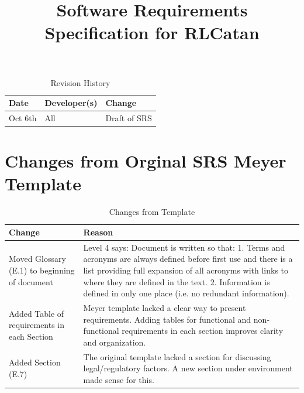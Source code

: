 \documentclass{article}
\title{Software Requirements Specification for RLCatan\\\progname}
\author{\authname}
\date{}
\begin{document}
\maketitle

\begingroup
\newcommand{\oldnumberline}{\numberline}
\renewcommand{\numberline}[1]{}
\tableofcontents
\endgroup

\newpage

\begin{table}[hp]
\caption{Revision History} \label{TblRevisionHistory}
\begin{tabularx}{\textwidth}{llX}
\toprule
\textbf{Date} & \textbf{Developer(s)} & \textbf{Change}\\
\midrule
Oct 6th & All & Draft of SRS\\
\bottomrule
\end{tabularx}
\end{table}

\section*{Changes from Orginal SRS Meyer Template}

\begin{table}[H]
\caption{Changes from Template} \label{ChangesFromTemplate}
\begin{tabularx}{\textwidth}{|l|>{\raggedright\arraybackslash}X|}
\hline
\textbf{Change} & \textbf{Reason} \\
\hline
Moved Glossary (E.1) to beginning of document & Level 4 says: Document is written so that: 1. Terms and acronyms are always defined before first use and there is a list providing full expansion of all acronyms with links to where they are defined in the text. 2. Information is defined in only one place (i.e. no redundant information). \\
\hline
Added Table of requirements in each Section & Meyer template lacked a clear way to present requirements. Adding tables for functional and non-functional requirements in each section improves clarity and organization. \\
\hline
Added Section (E.7) & The original template lacked a section for discussing legal/regulatory factors. A new section under environment made sense for this. \\
\hline
\end{tabularx}
\end{table}



\medskip
\end{document}
